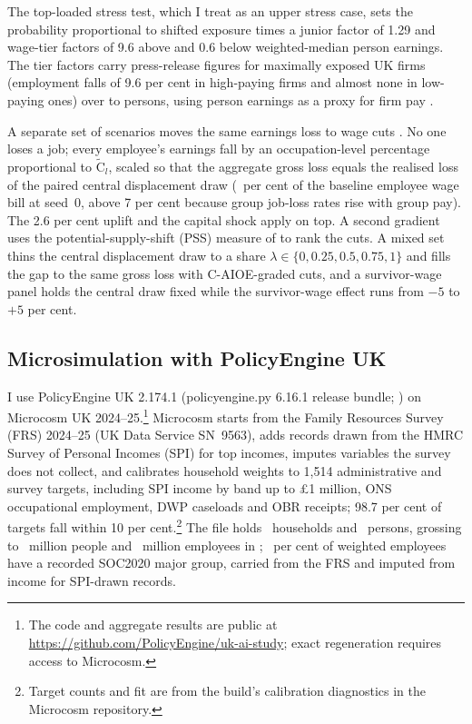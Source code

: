 The top-loaded stress test, which I treat as an upper stress case, sets the probability proportional to shifted exposure times a junior factor of 1.29 and wage-tier factors of 9.6 above and 0.6 below weighted-median person earnings. The tier factors carry press-release figures for maximally exposed UK firms (employment falls of 9.6 per cent in high-paying firms and almost none in low-paying ones) over to persons, using person earnings as a proxy for firm pay \citep{kleinteeselink2025}.

A separate set of scenarios moves the same earnings loss to wage cuts \citep{acemoglu2022tasks}. No one loses a job; every employee's earnings fall by an occupation-level percentage proportional to $\widetilde{\text{C}}_l$, scaled so that the aggregate gross loss equals the realised loss of the paired central displacement draw (\genGrossCutSharePct~per cent of the baseline employee wage bill at seed~0, above 7 per cent because group job-loss rates rise with group pay). The 2.6 per cent uplift and the capital shock apply on top. A second gradient uses the potential-supply-shift (PSS) measure of \citet{hosseinilichtinger2026barriers} to rank the cuts. A mixed set thins the central displacement draw to a share $\lambda\in\{0,0.25,0.5,0.75,1\}$ and fills the gap to the same gross loss with C-AIOE-graded cuts, and a survivor-wage panel holds the central draw fixed while the survivor-wage effect runs from $-5$ to $+5$ per cent.

\subsection{Microsimulation with PolicyEngine UK}
\label{sec:microsim}

I use PolicyEngine UK 2.174.1 (policyengine.py 6.16.1 release bundle; \citealp{ahmadi2026policyengine}) on Microcosm UK 2024--25.\footnote{The code and aggregate results are public at \url{https://github.com/PolicyEngine/uk-ai-study}; exact regeneration requires access to Microcosm.} Microcosm starts from the Family Resources Survey (FRS) 2024--25 (UK Data Service SN~9563), adds records drawn from the HMRC Survey of Personal Incomes (SPI) for top incomes, imputes variables the survey does not collect, and calibrates household weights to 1{,}514 administrative and survey targets, including SPI income by band up to \pounds 1 million, ONS occupational employment, DWP caseloads and OBR receipts; 98.7 per cent of targets fall within 10 per cent.\footnote{Target counts and fit are from the build's calibration diagnostics in the Microcosm repository.} The file holds \genDataHouseholds~households and \genDataPersons~persons, grossing to \genDataPopulationM~million people and \genDataEmployeesM~million employees in \genSimTaxYear; \genDataEmployeesSocPct~per cent of weighted employees have a recorded SOC2020 major group, carried from the FRS and imputed from income for SPI-drawn records.

